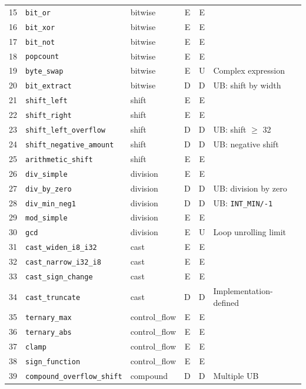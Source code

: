\documentclass[11pt]{article}
\begin{document}
\begin{table}[H]
\begin{tabular}{@{}rllccl@{}}
15 & \texttt{bit\_or}            & bitwise & E & E & \\
16 & \texttt{bit\_xor}           & bitwise & E & E & \\
17 & \texttt{bit\_not}           & bitwise & E & E & \\
18 & \texttt{popcount}           & bitwise & E & E & \\
19 & \texttt{byte\_swap}         & bitwise & E & U & Complex expression \\
20 & \texttt{bit\_extract}       & bitwise & D & D & UB: shift by width \\
21 & \texttt{shift\_left}        & shift & E & E & \\
22 & \texttt{shift\_right}       & shift & E & E & \\
23 & \texttt{shift\_left\_overflow} & shift & D & D & UB: shift $\geq$ 32 \\
24 & \texttt{shift\_negative\_amount} & shift & D & D & UB: negative shift \\
25 & \texttt{arithmetic\_shift}  & shift & E & E & \\
26 & \texttt{div\_simple}        & division & E & E & \\
27 & \texttt{div\_by\_zero}      & division & D & D & UB: division by zero \\
28 & \texttt{div\_min\_neg1}     & division & D & D & UB: \texttt{INT\_MIN/-1} \\
29 & \texttt{mod\_simple}        & division & E & E & \\
30 & \texttt{gcd}                & division & E & U & Loop unrolling limit \\
31 & \texttt{cast\_widen\_i8\_i32} & cast & E & E & \\
32 & \texttt{cast\_narrow\_i32\_i8} & cast & E & E & \\
33 & \texttt{cast\_sign\_change} & cast & E & E & \\
34 & \texttt{cast\_truncate}     & cast & D & D & Implementation-defined \\
35 & \texttt{ternary\_max}       & control\_flow & E & E & \\
36 & \texttt{ternary\_abs}       & control\_flow & E & E & \\
37 & \texttt{clamp}              & control\_flow & E & E & \\
38 & \texttt{sign\_function}     & control\_flow & E & E & \\
39 & \texttt{compound\_overflow\_shift} & compound & D & D & Multiple UB \\

\end{tabular}
\end{table}
\end{document}
